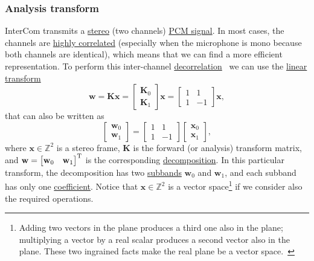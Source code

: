 \subsubsection{Analysis transform}
InterCom transmits a
\href{https://en.wikipedia.org/wiki/Stereophonic_sound}{stereo} (two
channels)
\href{https://en.wikipedia.org/wiki/Pulse-code_modulation}{PCM
  signal}. In most cases, the channels are
\href{https://en.wikipedia.org/wiki/Binaural_recording}{highly
  correlated} (especially when the microphone is mono because both
channels are identical), which means that we can find a more efficient
representation. To perform this inter-channel
\href{https://en.wikipedia.org/wiki/Decorrelation}{decorrelation}~\cite{thinkstats}
we can use the \href{https://en.wikipedia.org/wiki/Linear_map}{linear
  transform}~\cite{strang4linear}
\begin{equation}
  {\mathbf w} = {\mathbf K}{\mathbf x} =
\begin{bmatrix} \mathbf{K}_0 \\ \mathbf{K}_1 \end{bmatrix}{\mathbf x} =
\begin{bmatrix} 1 & 1 \\ 1 & -1 \end{bmatrix}
{\mathbf x},
  \label{eq:forward_transform_matrix_form}
\end{equation}
that can also be written as
\begin{equation}
  \begin{bmatrix}
    {\mathbf w}_0 \\
    {\mathbf w}_1
  \end{bmatrix}
  = 
  \begin{bmatrix} 1 & 1 \\ 1 & -1 \end{bmatrix}
  \begin{bmatrix}
    {\mathbf x}_0 \\
    {\mathbf x}_1
  \end{bmatrix},
  \label{eq:forward_transform_matrix_form2}
\end{equation}
where ${\mathbf x}\in\mathbb{Z}^2$ is a stereo frame, ${\mathbf K}$ is
the forward (or analysis) transform matrix, and
${\mathbf w}=\begin{bmatrix} {\mathbf w}_0 & {\mathbf
    w}_1\end{bmatrix}^{\text T}$ is the corresponding
\href{https://en.wikipedia.org/wiki/Discrete_wavelet_transform}{decomposition}. In
this particular transform, the decomposition has two
\href{https://en.wikipedia.org/wiki/Sub-band_coding}{subbands}
${\mathbf w}_0$ and ${\mathbf w}_1$, and each subband has only one
\href{https://web.stanford.edu/class/ee398a/handouts/lectures/07-TransformCoding.pdf}{coefficient}. Notice
that ${\mathbf x}\in\mathbb{Z}^2$ is a vector space\footnote{Adding
  two vectors in the plane produces a third one also in the plane;
  multiplying a vector by a real scalar produces a second vector also
  in the plane. These two ingrained facts make the real plane be a
  vector space.~\cite{vetterli2014foundations}} if we consider also
the required operations.

